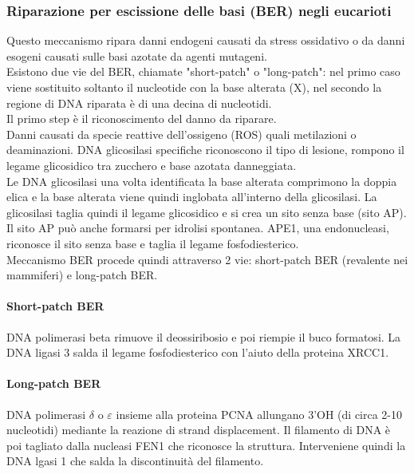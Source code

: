 \documentclass{article}
\begin{document}
\subsubsection{Riparazione per escissione delle basi (BER) negli eucarioti}
Questo meccanismo ripara danni endogeni causati da stress ossidativo o da danni esogeni causati sulle basi azotate da agenti mutageni.\\
Esistono due vie del BER, chiamate "short-patch" o "long-patch": nel primo caso viene
sostituito soltanto il nucleotide con la base alterata (X), nel secondo la regione di DNA riparata è di una decina di nucleotidi.\\
Il primo step è il riconoscimento del danno da riparare.\\
Danni causati da specie reattive dell'ossigeno (ROS) quali metilazioni o deaminazioni. DNA glicosilasi specifiche riconoscono il tipo di lesione, rompono il legame glicosidico tra zucchero e base azotata danneggiata.\\
Le DNA glicosilasi una volta identificata la base alterata comprimono la doppia elica e la base alterata viene quindi inglobata all'interno della glicosilasi. La glicosilasi taglia quindi il legame glicosidico e si crea un sito
senza base (sito AP). Il sito AP può anche formarsi per idrolisi spontanea. APE1, una endonucleasi, riconosce il sito senza base e taglia il legame fosfodiesterico.\\
Meccanismo BER procede quindi attraverso 2 vie: short-patch BER (revalente nei mammiferi) e long-patch BER.
\paragraph{Short-patch BER}DNA polimerasi beta rimuove il deossiribosio e poi riempie il buco
formatosi. La DNA ligasi 3 salda il legame fosfodiesterico con l'aiuto della proteina XRCC1.
\paragraph{Long-patch BER}DNA polimerasi $\delta $ o $\varepsilon $ insieme alla proteina
PCNA allungano 3'OH (di circa 2-10 nucleotidi) mediante la reazione di strand displacement. Il
filamento di DNA è poi tagliato dalla nucleasi FEN1 che riconosce la struttura. Interveniene quindi la DNA lgasi 1 che salda la discontinuità del filamento.
\end{document}
